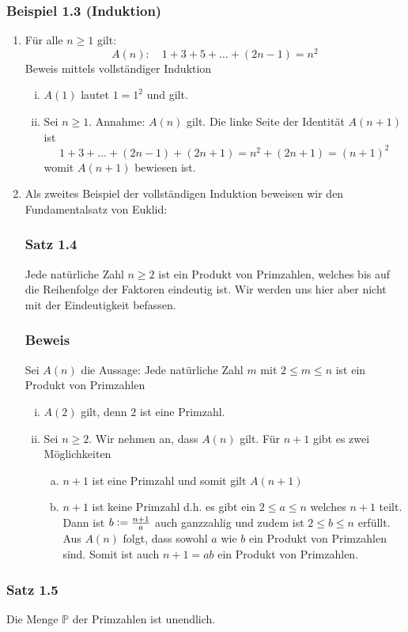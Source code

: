 \subsubsection*{Beispiel 1.3 (Induktion)}
\begin{enumerate}
\item Für alle $n\geq 1$ gilt: \[A(n): \quad 1+3+5+\dots +(2n-1)=n^2\] Beweis mittels vollständiger Induktion
\begin{enumerate}[i)]
\item $A(1)$ lautet $1=1^2$ und gilt.
\item Sei $n\geq 1$. Annahme: $A(n)$ gilt. Die linke Seite der Identität $A(n+1)$ ist \[1+3+\dots +(2n-1)+(2n+1)=n^{2}+(2n+1)=(n+1)^2\] womit $A(n+1)$ bewiesen ist.
\end{enumerate}
\item Als zweites Beispiel der vollständigen Induktion beweisen wir den Fundamentalsatz von Euklid:
\subsubsection*{Satz 1.4}
Jede natürliche Zahl $n\geq 2$ ist ein Produkt von Primzahlen, welches bis auf die Reihenfolge der Faktoren eindeutig ist. Wir werden uns hier aber nicht mit der Eindeutigkeit befassen.
\subsubsection*{Beweis}
Sei $A(n)$ die Aussage: Jede natürliche Zahl $m$ mit $2\leq m\leq n$ ist ein Produkt von Primzahlen
\begin{enumerate}[i)]
\item $A(2)$ gilt, denn $2$ ist eine Primzahl.
\item Sei $n\geq 2$. Wir nehmen an, dass $A(n)$ gilt. Für $n+1$ gibt es zwei Möglichkeiten
\begin{enumerate}[a)]
\item $n+1$ ist eine Primzahl und somit gilt $A(n+1)$ 
\item $n+1$ ist keine Primzahl d.h. es gibt ein $2\leq a\leq n$ welches $n+1$ teilt. Dann ist $b\vcentcolon=\frac{n+1}{a}$ auch ganzzahlig und zudem ist $2\leq b\leq n$ erfüllt. Aus $A(n)$ folgt, dass sowohl $a$ wie $b$ ein Produkt von Primzahlen sind. Somit ist auch $n+1=ab$ ein Produkt von Primzahlen. 
\end{enumerate}
\end{enumerate}
\end{enumerate}
\subsubsection*{Satz 1.5}
Die Menge $\mathbb{P}$ der Primzahlen ist unendlich.
